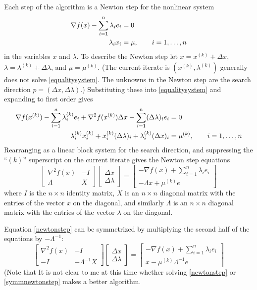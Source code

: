 \documentclass[11pt]{article}
\newcommand{\grad}{\nabla}
\begin{document}
Each step of the algorithm is a Newton step for the nonlinear system
\begin{align}
\grad f(x) - \sum_{i=1}^n \lambda_i e_i &= 0 \label{equalitysystem} \\
\lambda_i x_i &= \mu, \qquad i=1,\dots,n \notag
\end{align}
in the variables $x$ and $\lambda$.  To describe the Newton step let $x=x^{(k)}+\Delta x$, $\lambda=\lambda^{(k)}+\Delta\lambda$, and $\mu=\mu^{(k)}$.  (The current iterate is $(x^{(k)},\lambda^{(k)})$ generally does not solve \eqref{equalitysystem}.  The unknowns in the Newton step are the search direction $p=(\Delta x,\Delta \lambda)$.)  Substituting these into \eqref{equalitysystem} and expanding to first order gives
\begin{align}
\grad f(x^{(k)}) - \sum_{i=1}^n \lambda_i^{(k)} e_i + \grad^2 f(x^{(k)}) \Delta x - \sum_{i=1}^n (\Delta \lambda)_i e_i &= 0 \label{prenewtonstep} \\
\lambda_i^{(k)} x_i^{(k)} + x_i^{(k)} (\Delta\lambda)_i + \lambda_i^{(k)} (\Delta x)_i &= \mu^{(k)}, \qquad i=1,\dots,n \notag
\end{align}
Rearranging as a linear block system for the search direction, and suppressing the ``$(k)$'' superscript on the current iterate gives the Newton step equations
\begin{equation}
\begin{bmatrix}
\grad^2 f(x) & - I \\
\Lambda & X
\end{bmatrix}
\begin{bmatrix}
\Delta x \\
\Delta \lambda
\end{bmatrix}
=
\begin{bmatrix}
-\grad f(x) + \sum_{i=1}^n \lambda_i e_i \\
-\Lambda x + \mu^{(k)} e
\end{bmatrix}
 \label{newtonstep}
\end{equation}
where $I$ is the $n\times n$ identity matrix, $X$ is an $n\times n$ diagonal matrix with the entries of the vector $x$ on the diagonal, and similarly $\Lambda$ is an $n\times n$ diagonal matrix with the entries of the vector $\lambda$ on the diagonal.

Equation \eqref{newtonstep} can be symmetrized by multiplying the second half of the equations by $-\Lambda^{-1}$:
\begin{equation}
\begin{bmatrix}
\grad^2 f(x) & - I \\
-I & - \Lambda^{-1} X
\end{bmatrix}
\begin{bmatrix}
\Delta x \\
\Delta \lambda
\end{bmatrix}
=
\begin{bmatrix}
-\grad f(x) + \sum_{i=1}^n \lambda_i e_i \\
x - \mu^{(k)} \Lambda^{-1} e
\end{bmatrix}
 \label{symmnewtonstep}
\end{equation}
(Note that It is not clear to me at this time whether solving \eqref{newtonstep} or \eqref{symmnewtonstep} makes a better algorithm.
\end{document}
